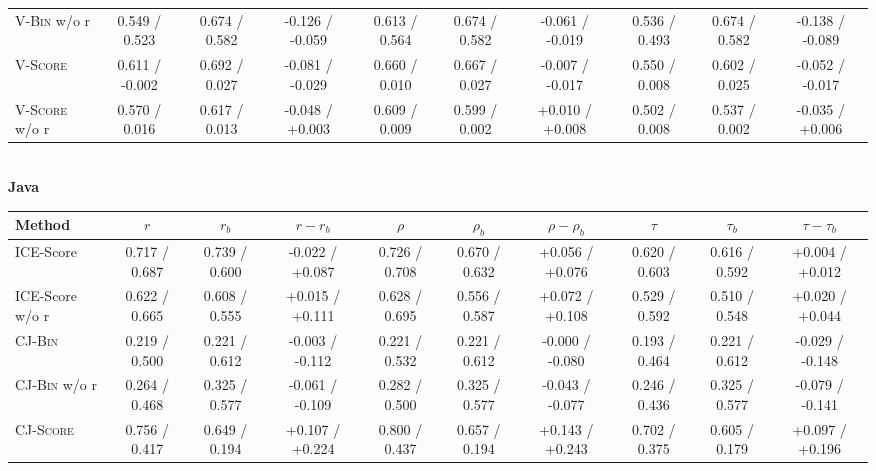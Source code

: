 \begin{table}[t]
\begin{tabular}{@{}l|ccc|ccc|ccc@{}}
        \textsc{V-Bin} w/o r    & 0.549 / 0.523   & 0.674 / 0.582   & -0.126 / -0.059                     & 0.613 / 0.564   & 0.674 / 0.582   & -0.061 / -0.019                     & 0.536 / 0.493   & 0.674 / 0.582   & -0.138 / -0.089                     \\
        \textsc{V-Score}        & 0.611 / -0.002  & 0.692 / 0.027   & -0.081 / -0.029                     & 0.660 / 0.010   & 0.667 / 0.027   & -0.007 / -0.017                     & 0.550 / 0.008   & 0.602 / 0.025   & -0.052 / -0.017                     \\
        \textsc{V-Score} w/o r  & 0.570 / 0.016   & 0.617 / 0.013   & -0.048 / +0.003                     & 0.609 / 0.009   & 0.599 / 0.002   & +0.010 / +0.008                     & 0.502 / 0.008   & 0.537 / 0.002   & -0.035 / +0.006                     \\
        \bottomrule
    \end{tabular}
    \\[7pt]
    {\bf Java}\\
    \begin{tabular}{@{}l|ccc|ccc|ccc@{}}
        \toprule
        Method & $r$ & $r_b$ & $r-r_b$ & $\rho$ & $\rho_b$ & $\rho-\rho_b$ & $\tau$ & $\tau_b$ & $\tau-\tau_b$ \\
        \midrule
        ICE-Score               & 0.717 / 0.687   & 0.739 / 0.600   & -0.022 / +0.087                     & 0.726 / 0.708   & 0.670 / 0.632   & +0.056 / +0.076                     & 0.620 / 0.603   & 0.616 / 0.592   & +0.004 / +0.012                     \\
        ICE-Score w/o r         & 0.622 / 0.665   & 0.608 / 0.555   & +0.015 / +0.111                     & 0.628 / 0.695   & 0.556 / 0.587   & +0.072 / +0.108                     & 0.529 / 0.592   & 0.510 / 0.548   & +0.020 / +0.044                     \\
        \midrule
        \textsc{CJ-Bin}         & 0.219 / 0.500   & 0.221 / 0.612   & -0.003 / -0.112                     & 0.221 / 0.532   & 0.221 / 0.612   & -0.000 / -0.080                     & 0.193 / 0.464   & 0.221 / 0.612   & -0.029 / -0.148                     \\
        \textsc{CJ-Bin} w/o r   & 0.264 / 0.468   & 0.325 / 0.577   & -0.061 / -0.109                     & 0.282 / 0.500   & 0.325 / 0.577   & -0.043 / -0.077                     & 0.246 / 0.436   & 0.325 / 0.577   & -0.079 / -0.141                     \\
        \textsc{CJ-Score}       & 0.756 / 0.417   & 0.649 / 0.194   & +0.107 / +0.224                     & 0.800 / 0.437   & 0.657 / 0.194   & +0.143 / +0.243                     & 0.702 / 0.375   & 0.605 / 0.179   & +0.097 / +0.196                     \\

\end{tabular}
\end{table}

